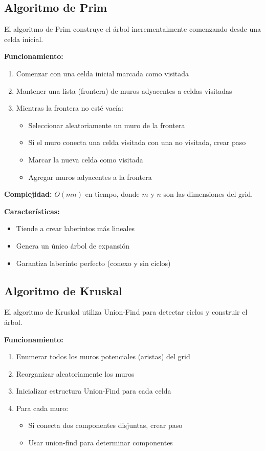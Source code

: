 \documentclass[12pt,a4paper]{article}
\begin{document}
\subsection{Algoritmo de Prim}

El algoritmo de Prim construye el árbol incrementalmente comenzando desde una celda inicial.

\textbf{Funcionamiento:}
\begin{enumerate}
    \item Comenzar con una celda inicial marcada como visitada
    \item Mantener una lista (frontera) de muros adyacentes a celdas visitadas
    \item Mientras la frontera no esté vacía:
    \begin{itemize}
        \item Seleccionar aleatoriamente un muro de la frontera
        \item Si el muro conecta una celda visitada con una no visitada, crear paso
        \item Marcar la nueva celda como visitada
        \item Agregar muros adyacentes a la frontera
    \end{itemize}
\end{enumerate}

\textbf{Complejidad:} $O(mn)$ en tiempo, donde $m$ y $n$ son las dimensiones del grid.

\textbf{Características:}
\begin{itemize}
    \item Tiende a crear laberintos más lineales
    \item Genera un único árbol de expansión
    \item Garantiza laberinto perfecto (conexo y sin ciclos)
\end{itemize}

\subsection{Algoritmo de Kruskal}

El algoritmo de Kruskal utiliza Union-Find para detectar ciclos y construir el árbol.

\textbf{Funcionamiento:}
\begin{enumerate}
    \item Enumerar todos los muros potenciales (aristas) del grid
    \item Reorganizar aleatoriamente los muros
    \item Inicializar estructura Union-Find para cada celda
    \item Para cada muro:
    \begin{itemize}
        \item Si conecta dos componentes disjuntas, crear paso
        \item Usar union-find para determinar componentes
    \end{itemize}
\end{enumerate}
\end{document}
